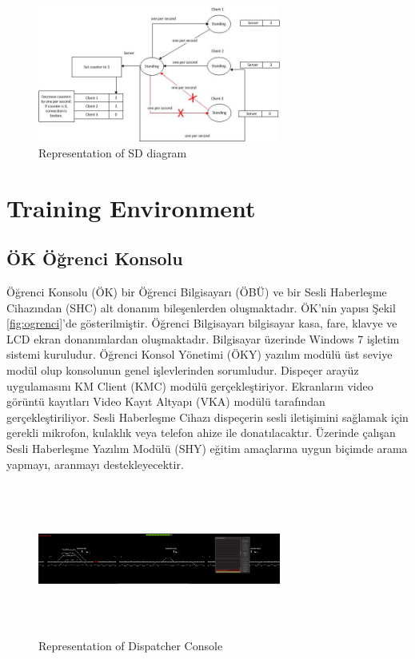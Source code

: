 \documentclass[conference]{IEEEtran}
\begin{document}
\begin{figure}[h!]
  \centering
  \includegraphics[width=8cm]{SDDiagram.jpg}
  \caption{Representation of SD  diagram}\label{fig:SDDiagram}
\end{figure}




\section{Training Environment}

\subsection{ÖK Öğrenci Konsolu}

Öğrenci Konsolu (ÖK) bir Öğrenci Bilgisayarı (ÖBÜ) ve bir Sesli Haberleşme Cihazından (SHC) alt donanım bileşenlerden oluşmaktadır. ÖK’nin yapısı Şekil \ref{fig:ogrenci}'de gösterilmiştir.
Öğrenci Bilgisayarı bilgisayar kasa, fare, klavye ve LCD ekran donanımlardan oluşmaktadır. Bilgisayar üzerinde Windows 7 işletim sistemi kuruludur. Öğrenci Konsol Yönetimi (ÖKY) yazılım modülü üst seviye modül olup konsolunun genel işlevlerinden sorumludur. Dispeçer arayüz uygulamasını KM Client (KMC) modülü gerçekleştiriyor. Ekranların video görüntü kayıtları Video Kayıt Altyapı (VKA) modülü tarafından gerçekleştiriliyor.
Sesli Haberleşme Cihazı dispeçerin sesli iletişimini sağlamak için gerekli mikrofon, kulaklık veya telefon ahize ile donatılacaktır. Üzerinde çalışan Sesli Haberleşme Yazılım Modülü (SHY) eğitim amaçlarına uygun biçimde arama yapmayı, aranmayı destekleyecektir. 

\begin{figure}[h!]
  \centering
  \includegraphics[width=8cm,height=5cm]{ogrenci.jpg}
  \caption{Representation of Dispatcher Console}\label{fig:smclass}
\end{figure}
\end{document}

